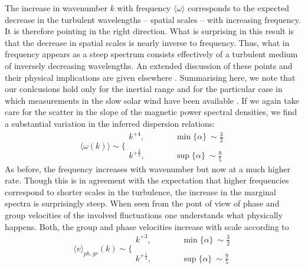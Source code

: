 \documentclass[ ]{copernicus2}
\begin{document}
{{{{The increase in { wavenumber $k$ with frequency $\langle\omega\rangle$} corresponds to the expected decrease in the turbulent wavelengths -- spatial scales -- with increasing frequency. It is therefore pointing in the right direction. What is surprising in this result is that the decrease in spatial scales is nearly inverse to frequency. Thus, what in frequency appears as a steep spectrum consists effectively of a turbulent medium of inversely decreasing wavelengths. An extended discussion of these points and their physical implications are given elsewhere \citep{treumann2017}. {Summarising here, we note that our conlcusions hold only for the inertial range and for the particular case in which measurements in the slow solar wind have been available \citep{chen2011}. If we again take care for the scatter in the slope of the magnetic power spectral densities, we find a substantial variation in the inferred dispersion relations:
\begin{equation}
\langle\omega(k)\rangle\sim \bigg\{
\begin{array}{ccc}
 k^{+4}, & \quad\quad   &  \min\{\alpha\}\ \sim \frac{3}{2} \\[-1ex]
  &   &   \\[-1ex]
 k^{+\frac{3}{2}}, & \quad\quad  &  \sup\{\alpha\}\ \sim \frac{9}{5}
\end{array}
\end{equation} 
As before, the frequency increases with wavenumber but now at a much higher rate. Though this is in agreement with the expectation that higher frequencies correspond to shorter scales in the turbulence, the increase in the marginal spectra is surprisingly steep. When seen from the pont of view of phase and group velocities of the involved fluctuations one understands what physically happens. Both, the group and phase velocities increase with scale according to
\begin{equation}
\langle v\rangle_\mathit{ph,gr}(k)\sim \bigg\{
\begin{array}{ccc}
 k^{+3}, & \quad\quad   &  \min\{\alpha\}\ \sim \frac{3}{2} \\[-1ex]
  &   &   \\[-1ex]
 k^{+\frac{1}{2}}, & \quad\quad  &  \sup\{\alpha\}\ \sim \frac{9}{5}
\end{array}
\end{equation}
}}}}}
\end{document}
